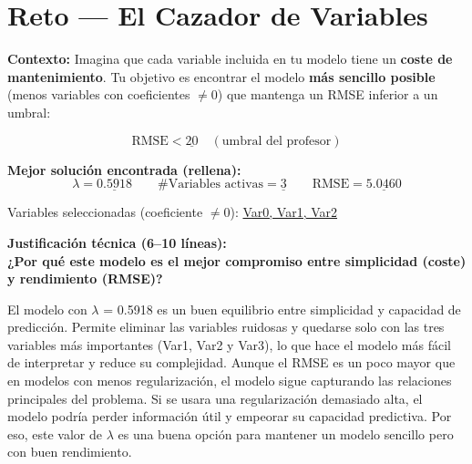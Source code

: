 \documentclass[12pt,oneside]{book}
\begin{document}
\newpage

\section{Reto — El Cazador de Variables}

\noindent\textbf{Contexto:} Imagina que cada variable incluida en tu modelo tiene un \textbf{coste de mantenimiento}.
Tu objetivo es encontrar el modelo \textbf{más sencillo posible} (menos variables con coeficientes $\neq 0$)
que mantenga un RMSE inferior a un umbral:

\[
\text{RMSE} < \underline{20} \quad (\text{umbral del profesor})
\]

\vspace{0.3cm}
\noindent\textbf{Mejor solución encontrada (rellena):}
\[
\lambda = \underline{0.5918}
\quad\quad
\text{\#Variables activas} = \underline{3}
\quad\quad
\text{RMSE} = \underline{5.0460}
\]

\vspace{0.3cm}
\noindent Variables seleccionadas (coeficiente $\neq 0$):
\underline{Var0, Var1, Var2}

\vspace{0.5cm}
\begin{center}
\end{center}

\vspace{0.3cm}
\noindent\textbf{Justificación técnica (6--10 líneas):}\\
\textbf{¿Por qué este modelo es el mejor compromiso entre simplicidad (coste) y rendimiento (RMSE)?}

El modelo con $\lambda$ = 0.5918 es un buen equilibrio entre simplicidad y capacidad de predicción. Permite eliminar las variables ruidosas y quedarse solo con las tres variables más importantes (Var1, Var2 y Var3), lo que hace el modelo más fácil de interpretar y reduce su complejidad. Aunque el RMSE es un poco mayor que en modelos con menos regularización, el modelo sigue capturando las relaciones principales del problema. Si se usara una regularización demasiado alta, el modelo podría perder información útil y empeorar su capacidad predictiva. Por eso, este valor de $\lambda$ es una buena opción para mantener un modelo sencillo pero con buen rendimiento.
\vspace{2.2cm}
\newpage
\end{document}
